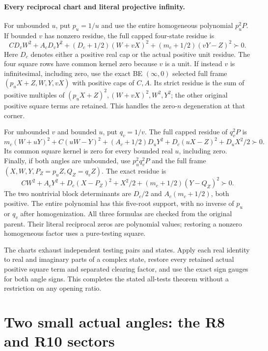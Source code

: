 \paragraph{Every reciprocal chart and literal projective infinity.}
For unbounded $u$, put $p_u=1/u$ and use the entire homogeneous
polynomial $p_u^2P$. If bounded $v$ has nonzero residue, the full
capped four-state residue is
\[
 CD_vW^2+A_cD_vY^2+(D_c+1/2)(W+vX)^2
                          +(m_c+1/2)(vY-Z)^2\succ0.             \tag{RU28}
\]
Here $D_c$ denotes either a positive real cap or the actual positive
unit residue. The four square rows have common kernel zero because
$v$ is a unit. If instead $v$ is infinitesimal, including zero,
use the exact BE $(\infty,0)$ selected full frame
$(p_uX+Z,W,Y,vX)$ with positive caps of $C,A$. Its strict residue
is the sum of positive multiples of
$(p_uX+Z)^2,(W+vX)^2,W^2,Y^2$; the other original positive square terms are
retained. This handles the zero-$n$ degeneration at that corner.

For unbounded $v$ and bounded $u$, put $q_v=1/v$. The full capped
residue of $q_v^2P$ is
\[
 m_c(W+uY)^2+C(uW-Y)^2+(A_c+1/2)D_uY^2
                         +D_c(uX-Z)^2+D_uX^2/2\succ0.           \tag{RU29}
\]
Its common square kernel is zero for every bounded real $u$,
including zero. Finally, if both angles are unbounded, use
$p_u^2q_v^2P$ and the full frame
$(X,W,Y,P_Z=p_uZ,Q_Z=q_vZ)$. The exact residue is
\[
 CW^2+A_cY^2+D_c(X-P_Z)^2+X^2/2
                           +(m_c+1/2)(Y-Q_Z)^2\succ0.           \tag{RU30}
\]
The two nontrivial block determinants are $D_c/2$ and
$A_c(m_c+1/2)$, both positive. The entire polynomial has this
five-root support, with no inverse of $p_u$ or $q_v$ after
homogenization. All three formulas are checked from the original
parent. Their literal reciprocal zeros are polynomial values;
restoring a nonzero homogeneous factor uses a pure-testing square.

The charts exhaust independent testing pairs and states. Apply each
real identity to real and imaginary parts of a complex state, restore
every retained actual positive square term and separated clearing factor, and use
the exact sign gauges for both angle signs. This completes the stated
all-tests theorem without a restriction on any opening ratio.

\section{Two small actual angles: the R8 and R10 sectors}

